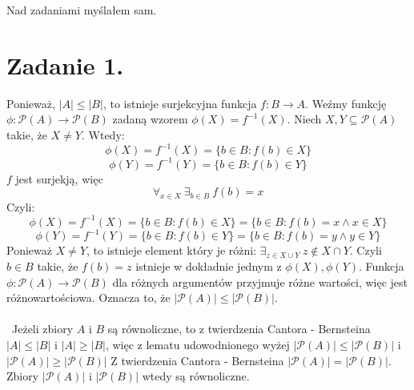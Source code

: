 \documentclass{article}
\begin{document}
\newcommand{\imp}{\Rightarrow}
\newcommand{\lub}{\vee}
\newcommand{\roz}{\setminus}
\newcommand{\zbp}{\emptyset}
\newcommand{\zbpot}{\mathcal{P}}
\newcommand{\troj}{\bigtriangleup}
\newcommand{\nat}{\mathbb{N}}
\newcommand{\calk}{\mathbb{Z}}
\newcommand{\rze}{\mathbb{R}}
\newcommand{\wegde}{\wedge}
\newcommand{\eps}{\varepsilon}
\maketitle
Nad zadaniami myślałem sam. 
\section*{Zadanie 1.}
Ponieważ, $|A|\leq|B|$, to istnieje surjekcyjna funkcja $f: B \rightarrow A$. Weźmy funkcję $\phi: \zbpot(A) \rightarrow \zbpot(B)$ zadaną wzorem $\phi (X) = f^{-1} (X)$. Niech $X,Y \subseteq \zbpot(A) $ takie, że $X\neq Y$. Wtedy:
\[ \phi (X) = f^{-1}(X) = \{b\in B: f(b)\in X \}\]
\[ \phi (Y) = f^{-1}(Y) = \{b\in B: f(b)\in Y \}\]
$f$ jest surjekją, więc \[\forall_{x \in X} \ \exists_{b\in B} \ f(b) = x\]
Czyli:
\[ \phi (X) = f^{-1}(X) = \{b\in B: f(b)\in X \} = \{b\in B: f(b)=x \wegde x\in X\}\]
\[ \phi (Y) = f^{-1}(Y) = \{b\in B: f(b)\in Y \} = \{b\in B: f(b)=y \wegde y\in Y\}\]
Ponieważ $X \neq Y$, to istnieje element który je różni: $\exists_{z\in X \cup Y} \ z \notin X \cap Y$. Czyli $b \in B$ takie, że $f(b) = z$ istnieje w dokładnie jednym z $ \phi(X), \phi(Y)$. Funkcja $\phi : \zbpot(A) \rightarrow \zbpot(B)$ dla różnych argumentów przyjmuje różne wartości, więc jest różnowartościowa. Oznacza to, że $|\zbpot(A)|\leq|\zbpot(B)|$.
\\\
\\\
Jeżeli zbiory $A$ i $B$ są równoliczne, to z twierdzenia Cantora - Bernsteina $|A|\leq|B|$ i $|A|\geq|B|$, więc z lematu udowodnionego wyżej $|\zbpot(A)|\leq|\zbpot(B)|$ i $|\zbpot(A)|\geq|\zbpot(B)|$
Z twierdzenia Cantora - Bernsteina $|\zbpot(A)| = |\zbpot(B)|$. Zbiory $|\zbpot(A)|$ i $|\zbpot(B)|$ wtedy są równoliczne.
\end{document}
